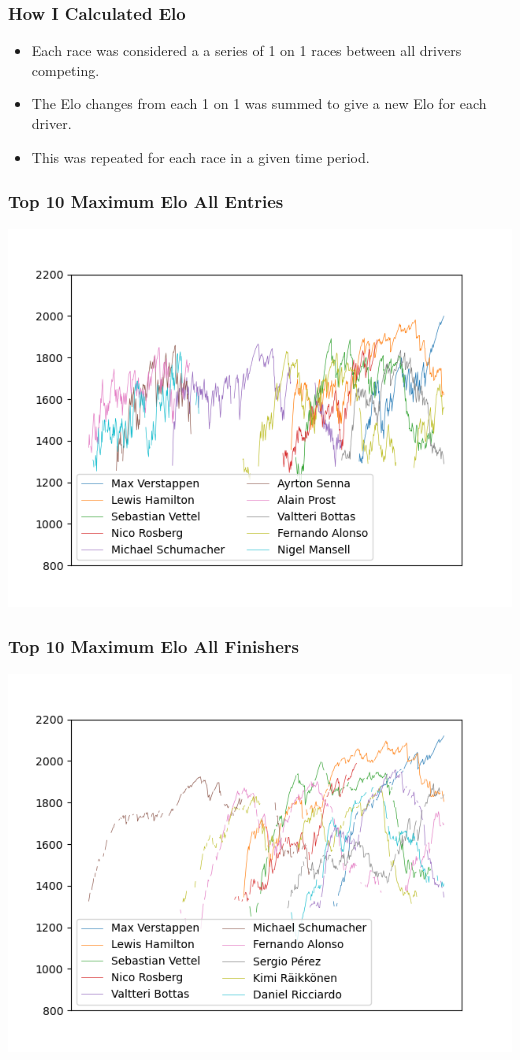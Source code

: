 \documentclass{beamer}
\begin{document}
\begin{frame}
    \frametitle{How I Calculated Elo}
    \begin{itemize}
        \item Each race was considered a a series of 1 on 1 races between all drivers competing.
        \item The Elo changes from each 1 on 1 was summed to give a new Elo for each driver.
        \item This was repeated for each race in a given time period.
    \end{itemize}
\end{frame}

\begin{frame}
    \frametitle{Top 10 Maximum Elo All Entries}
    \includegraphics[width=\textwidth]{AllTimeTop10EloAll.png}
\end{frame}

\begin{frame}
    \frametitle{Top 10 Maximum Elo All Finishers}
    \includegraphics[width=\textwidth]{AllTimeTop10EloFinished.png}
\end{frame}
\end{document}
